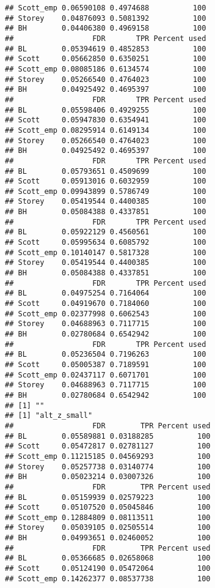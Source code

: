\documentclass{article}\usepackage[]{graphicx}\usepackage[]{color}
\makeatletter
\newenvironment{kframe}{%
 \def\at@end@of@kframe{}%
 \ifinner\ifhmode%
  \def\at@end@of@kframe{\end{minipage}}%
  \begin{minipage}{\columnwidth}%
 \fi\fi%
 \def\FrameCommand##1{\hskip\@totalleftmargin \hskip-\fboxsep
 \colorbox{shadecolor}{##1}\hskip-\fboxsep
     \hskip-\linewidth \hskip-\@totalleftmargin \hskip\columnwidth}%
 \MakeFramed {\advance\hsize-\width
   \@totalleftmargin\z@ \linewidth\hsize
   \@setminipage}}%
 {\par\unskip\endMakeFramed%
 \at@end@of@kframe}
\newenvironment{knitrout}{}{} %
\makeatother
\begin{document}
\begin{knitrout}
\begin{kframe}
\begin{verbatim}
## Scott_emp 0.06590108 0.4974688          100
## Storey    0.04876093 0.5081392          100
## BH        0.04406380 0.4969158          100
##                  FDR       TPR Percent used
## BL        0.05394619 0.4852853          100
## Scott     0.05662850 0.6350251          100
## Scott_emp 0.08085186 0.6134574          100
## Storey    0.05266540 0.4764023          100
## BH        0.04925492 0.4695397          100
##                  FDR       TPR Percent used
## BL        0.05598406 0.4929255          100
## Scott     0.05947830 0.6354941          100
## Scott_emp 0.08295914 0.6149134          100
## Storey    0.05266540 0.4764023          100
## BH        0.04925492 0.4695397          100
##                  FDR       TPR Percent used
## BL        0.05793651 0.4509699          100
## Scott     0.05913016 0.6032959          100
## Scott_emp 0.09943899 0.5786749          100
## Storey    0.05419544 0.4400385          100
## BH        0.05084388 0.4337851          100
##                  FDR       TPR Percent used
## BL        0.05922129 0.4560561          100
## Scott     0.05995634 0.6085792          100
## Scott_emp 0.10140147 0.5817328          100
## Storey    0.05419544 0.4400385          100
## BH        0.05084388 0.4337851          100
##                  FDR       TPR Percent used
## BL        0.04975254 0.7164064          100
## Scott     0.04919670 0.7184060          100
## Scott_emp 0.02377998 0.6062543          100
## Storey    0.04688963 0.7117715          100
## BH        0.02780684 0.6542942          100
##                  FDR       TPR Percent used
## BL        0.05236504 0.7196263          100
## Scott     0.05005387 0.7189591          100
## Scott_emp 0.02437117 0.6071701          100
## Storey    0.04688963 0.7117715          100
## BH        0.02780684 0.6542942          100
## [1] ""
## [1] "alt_z_small"
##                  FDR        TPR Percent used
## BL        0.05589881 0.03188285          100
## Scott     0.05472817 0.02781127          100
## Scott_emp 0.11215185 0.04569293          100
## Storey    0.05257738 0.03140774          100
## BH        0.05023214 0.03007326          100
##                  FDR        TPR Percent used
## BL        0.05159939 0.02579223          100
## Scott     0.05107520 0.05045846          100
## Scott_emp 0.12884809 0.08113511          100
## Storey    0.05039105 0.02505514          100
## BH        0.04993651 0.02460052          100
##                  FDR        TPR Percent used
## BL        0.05366685 0.02658068          100
## Scott     0.05124190 0.05472064          100
## Scott_emp 0.14262377 0.08537738          100

\end{verbatim}
\end{kframe}
\end{knitrout}
\end{document}
